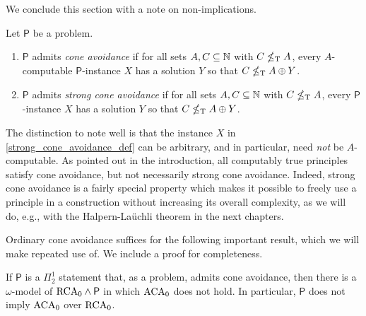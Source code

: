 We conclude this section with a note on non-implications.

\begin{definition}
	Let $\mathsf{P}$ be a problem.
	\begin{enumerate}
		\item\label{cone_avoidance_def} $\mathsf{P}$ admits \emph{cone avoidance} if for all sets $A,C \subseteq \mathbb{N}$ with $C \nleq_{\text{\upshape T}} A$, every $A$-computable $\mathsf{P}$-instance $X$ has a solution $Y$ so that $C \nleq_{\text{\upshape T}} A \oplus Y$.
		\item\label{strong_cone_avoidance_def} $\mathsf{P}$ admits \emph{strong cone avoidance} if for all sets $A,C  \subseteq \mathbb{N}$ with $C \nleq_{\text{\upshape T}} A$, every $\mathsf{P}$-instance $X$ has a solution $Y$ so that $C \nleq_{\text{\upshape T}} A \oplus Y$.
	\end{enumerate}
\end{definition}

\noindent The distinction to note well is that the instance $X$ in \cref{strong_cone_avoidance_def} can be arbitrary, and in particular, need \emph{not} be $A$-computable. As pointed out in the introduction, all computably true principles satisfy cone avoidance, but not necessarily strong cone avoidance. Indeed, strong cone avoidance is a fairly special property which makes it possible to freely use a principle in a construction without increasing its overall complexity, as we will do, e.g., with the Halpern-La\"{u}chli theorem in the next chapters.

Ordinary cone avoidance suffices for the following important result, which we will make repeated use of. We include a proof for completeness.

\begin{lemma}\label{lem:cone-avoidance-not-aca}
	If $\mathsf{P}$ is a $\Pi^1_2$ statement that, as a problem, admits cone avoidance, then there is a $\omega$-model of $\mathrm{RCA}_0 \wedge \mathsf{P}$ in which $\mathrm{ACA}_0$ does not hold. In particular, $\mathsf{P}$ does not imply $\mathrm{ACA}_0$ over $\mathrm{RCA}_0$.
\end{lemma}

